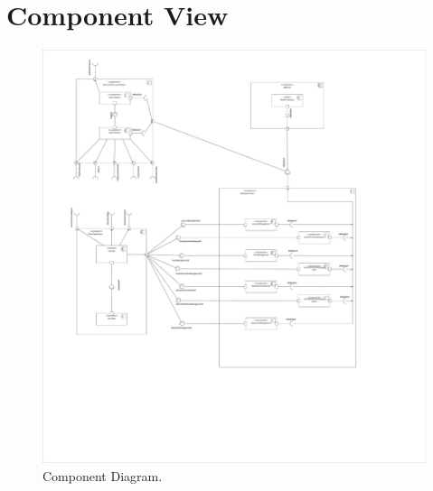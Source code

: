 \section{Component View}

\begin{figure}[h!]
	\centering
	\includegraphics[width=0.8\linewidth]{./Iterazione 1/OtherFiles/UML - Component View}
	\caption{Component Diagram.}
	\label{fig:ComponentDiagram}
\end{figure}